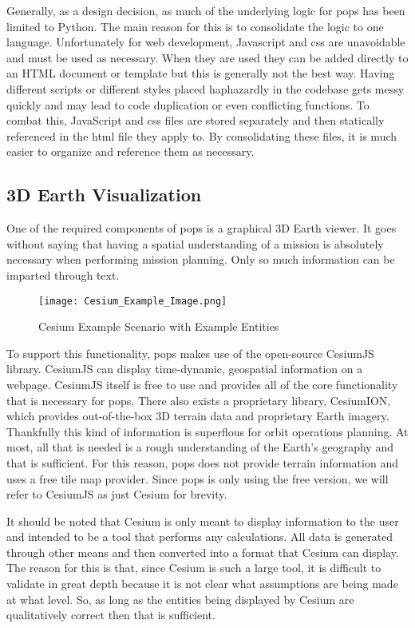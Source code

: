 Generally, as a design decision, as much of the underlying logic for \gls{pops}
has been limited to Python. The main reason for this is to consolidate the
logic to one language. Unfortunately for web development, Javascript and
\gls{css} are unavoidable and must be used as necessary. When they are used
they can be added directly to an HTML document or template but this is
generally not the best way. Having different scripts or different styles placed
haphazardly in the codebase gets messy quickly and may lead to code duplication
or even conflicting functions. To combat this, JavaScript and \gls{css} files
are stored separately and then statically referenced in the \gls{html} file
they apply to. By consolidating these files, it is much easier to organize and
reference them as necessary. 

\subsection{3D Earth Visualization}

One of the required components of \gls{pops} is a graphical 3D Earth viewer.
It goes without saying that having a spatial understanding of a mission is
absolutely necessary when performing mission planning. Only so much information
can be imparted through text.

\begin{figure}[h]
    \centering
    \texttt{[image: Cesium\_Example\_Image.png]} 
    \caption{Cesium Example Scenario with Example Entities}
\label{fig:example_cesium}
\end{figure}

To support this functionality, \gls{pops} makes use of the open-source CesiumJS
library. CesiumJS can display time-dynamic, geospatial information on a
webpage. CesiumJS itself is free to use and provides all of the core
functionality that is necessary for \gls{pops}. There also exists a proprietary
library, CesiumION, which provides out-of-the-box 3D terrain data and
proprietary Earth imagery. Thankfully this kind of information is superflous
for orbit operations planning. At most, all that is needed is a rough
understanding of the Earth's geography and that is sufficient. For this reason,
\gls{pops} does not provide terrain information and uses a free tile map
provider. Since \gls{pops} is only using the free version, we will refer to
CesiumJS as just Cesium for brevity. 

It should be noted that Cesium is only meant to display information to the user
and intended to be a tool that performs any calculations. All data is generated
through other means and then converted into a format that Cesium can display.
The reason for this is that, since Cesium is such a large tool, it is difficult
to validate in great depth because it is not clear what assumptions are being
made at what level. So, as long as the entities being displayed by Cesium are
qualitatively correct then that is sufficient.

